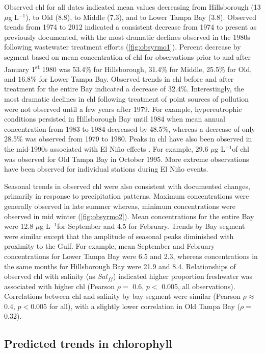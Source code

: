 \documentclass[letterpaper,12pt,oneside]{article}\usepackage{graphicx, color}
\newcommand{\mugl}{$\mu$g L$^{-1}$}
\begin{document}
Observed \ac{chl} for all dates indicated mean values decreasing from Hillsborough (13 \mugl), to Old (8.8), to Middle (7.3), and to Lower Tampa Bay (3.8).  Observed trends from 1974 to 2012 indicated a consistent decrease from 1974 to present as previously documented, with the most dramatic declines observed in the 1980s following wastewater treatment efforts (\cref{fig:obsyrmo1}).  Percent decrease by segment based on mean concentration of \ac{chl} for observations prior to and after January 1\textsuperscript{st} 1980 was 53.4\% for Hillsborough, 31.4\% for Middle,  25.5\% for Old, and 16.8\% for Lower Tampa Bay.  Observed trends in \ac{chl} before and after treatment for the entire Bay indicated a decrease of 32.4\%. Interestingly, the most dramatic declines in \ac{chl} following treatment of point sources of pollution were not observed until a few years after 1979.  For example, hypereutrophic conditions persisted in Hillsborough Bay until 1984 when mean annual concentration from 1983 to 1984 decreased by 48.5\%, whereas a decrease of only 28.5\% was observed from 1979 to 1980.  Peaks in \ac{chl} have also been observed in the mid-1990s associated with El Ni\~{n}o effects \citep{Greening06}.  For example, 29.6 \mugl of \ac{chl} was observed for Old Tampa Bay in October 1995.  More extreme observations have been observed for individual stations during El Ni\~{n}o events. 

Seasonal trends in observed \ac{chl} were also consistent with documented changes, primarily in response to precipitation patterns.  Maximum concentrations were generally observed in late summer whereas, minimum concentrations were observed in mid winter (\cref{fig:obsyrmo2}).  Mean concentrations for the entire Bay were 12.8 \mugl for September and 4.5 for February.  Trends by Bay segment were similar except that the amplitude of seasonal peaks diminished with proximity to the Gulf.  For example, mean September and February concentrations for Lower Tampa Bay were 6.5 and 2.3, whereas concentrations in the same months for Hillsborough Bay were 21.9 and 8.4.  Relationships of observed \ac{chl} with salinity (as $Sal_{ff}$) indicated higher proportion freshwater was associated with higher \ac{chl} (Pearson $\rho=$ 0.6, $p<$ 0.005, all observations).  Correlations between \ac{chl} and salinity by bay segment were similar (Pearson $\rho \approx$ 0.4, $p<0.005$ for all), with a slightly lower correlation in Old Tampa Bay ($\rho=$ 0.32).

\subsection{Predicted trends in chlorophyll}
\end{document}
